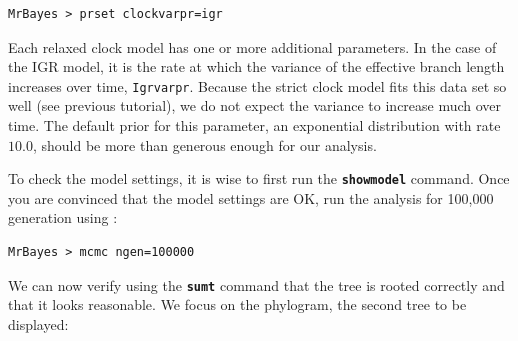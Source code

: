 \documentclass[12pt]{book}
\newcommand{\ttt}[1]{\texttt{#1}}
\newcommand{\tb}[1]{\ttt{\textbf{#1}}}
\begin{document}
\small
\begin{singlespacing}
\begin{verbatim}
MrBayes > prset clockvarpr=igr
\end{verbatim}
\end{singlespacing}
\normalsize

Each relaxed clock model has one or more additional parameters. In the case of the IGR model, it is
the rate at which the variance of the effective branch length increases over time, \ttt{Igrvarpr}.
Because the strict clock model fits this data set so well (see previous tutorial), we do not expect
the variance to increase much over time. The default prior for this parameter, an exponential
distribution with rate $10.0$, should be more than generous enough for our analysis.

To check the model settings, it is wise to first run the \tb{showmodel} command. Once you are
convinced that the model settings are OK, run the analysis for 100,000 generation using :

\small
\begin{singlespacing}
\begin{verbatim}
MrBayes > mcmc ngen=100000
\end{verbatim}
\end{singlespacing}
\normalsize

We can now verify using the \tb{sumt} command that the tree is rooted correctly and that it
looks reasonable. We focus on the phylogram, the second tree to be displayed:
\end{document}
